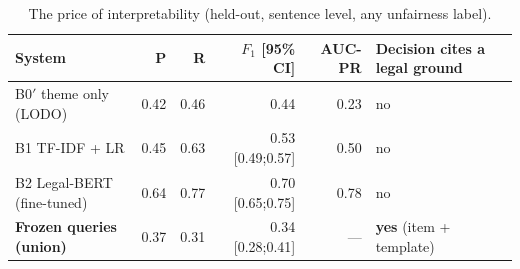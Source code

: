 \begin{table}[t]
\caption{The price of interpretability (held-out, sentence level, any unfairness label).}
\label{tab:cost}
\centering
\footnotesize\setlength{\tabcolsep}{4pt}
\begin{tabular}{@{}lrrrrl@{}}
\toprule
System & P & R & $F_1$ [95\% CI] & AUC-PR & Decision cites a legal ground \\
\midrule
B0$'$ theme only (LODO) & 0.42 & 0.46 & 0.44 & 0.23 & no \\
B1 TF-IDF + LR & 0.45 & 0.63 & 0.53 [0.49;0.57] & 0.50 & no \\
B2 Legal-BERT (fine-tuned) & 0.64 & 0.77 & 0.70 [0.65;0.75] & 0.78 & no \\
\textbf{Frozen queries (union)} & 0.37 & 0.31 & 0.34 [0.28;0.41] & --- & \textbf{yes} (item + template) \\
\bottomrule
\end{tabular}
\end{table}
